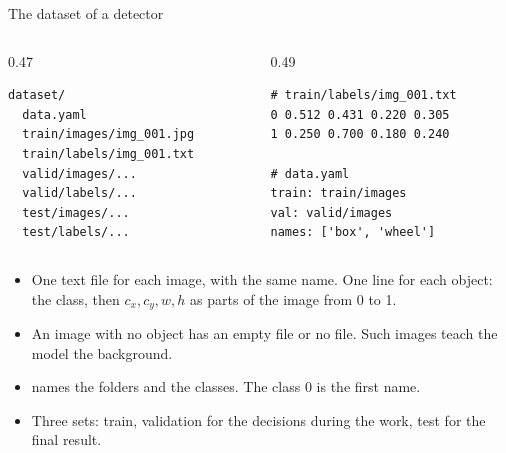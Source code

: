 \begin{frame}[fragile]{The dataset of a detector}
  \begin{columns}[T]
    \begin{column}{0.47\textwidth}
\begin{lstlisting}
dataset/
  data.yaml
  train/images/img_001.jpg
  train/labels/img_001.txt
  valid/images/...
  valid/labels/...
  test/images/...
  test/labels/...
\end{lstlisting}
    \end{column}
    \begin{column}{0.49\textwidth}
\begin{lstlisting}
# train/labels/img_001.txt
0 0.512 0.431 0.220 0.305
1 0.250 0.700 0.180 0.240

# data.yaml
train: train/images
val: valid/images
names: ['box', 'wheel']
\end{lstlisting}
    \end{column}
  \end{columns}
  \small
  \begin{itemize}
    \item One text file for each image, with the same name. One line for
          each object: the class, then $c_x, c_y, w, h$ as parts of the
          image from 0 to 1.
    \item An image with no object has an empty file or no file. Such
          images teach the model the background.
    \item {} names the folders and the classes. The class 0
          is the first name.
    \item Three sets: train, validation for the decisions during the work,
          test for the final result.
  \end{itemize}
\end{frame}

